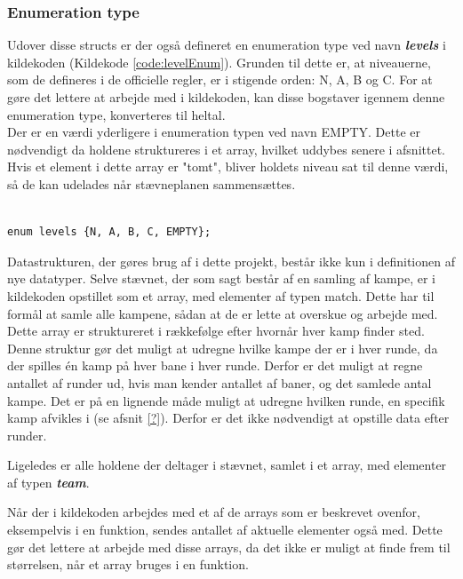 \subsubsection{Enumeration type}
Udover disse structs er der også defineret en enumeration type ved navn \textbf{\textit{levels}} i kildekoden (Kildekode \ref{code:levelEnum}). Grunden til dette er, at niveauerne, som de defineres i de officielle regler, er i stigende orden: N, A, B og C. For at gøre det lettere at arbejde med i kildekoden, kan disse bogstaver igennem denne enumeration type, konverteres til heltal. \\
Der er en værdi yderligere i enumeration typen ved navn EMPTY. Dette er nødvendigt da holdene struktureres i et array, hvilket uddybes senere i afsnittet. Hvis et element i dette array er "tomt", bliver holdets niveau sat til denne værdi, så de kan udelades når stævneplanen sammensættes.

\begin{listing}
\begin{verbatim}

enum levels {N, A, B, C, EMPTY};

\end{verbatim}
\label{code:levelEnum}
\end{listing}

Datastrukturen, der gøres brug af i dette projekt, består ikke kun i definitionen af nye datatyper. Selve stævnet, der som sagt består af en samling af kampe, er i kildekoden opstillet som et array, med elementer af typen match. Dette har til formål at samle alle kampene, sådan at de er lette at overskue og arbejde med. Dette array er struktureret i rækkefølge efter hvornår hver kamp finder sted. Denne struktur gør det muligt at udregne hvilke kampe der er i hver runde, da der spilles én kamp på hver bane i hver runde. Derfor er det muligt at regne antallet af runder ud, hvis man kender antallet af baner, og det samlede antal kampe. Det er på en lignende måde muligt at udregne hvilken runde, en specifik kamp afvikles i (se afsnit \ref{?}). Derfor er det ikke nødvendigt at opstille data efter runder.
\par
Ligeledes er alle holdene der deltager i stævnet, samlet i et array, med elementer af typen \textbf{\textit{team}}.
\par
Når der i kildekoden arbejdes med et af de arrays som er beskrevet ovenfor, eksempelvis i en funktion, sendes antallet af aktuelle elementer også med. Dette gør det lettere at arbejde med disse arrays, da det ikke er muligt at finde frem til størrelsen, når et array bruges i en funktion.

